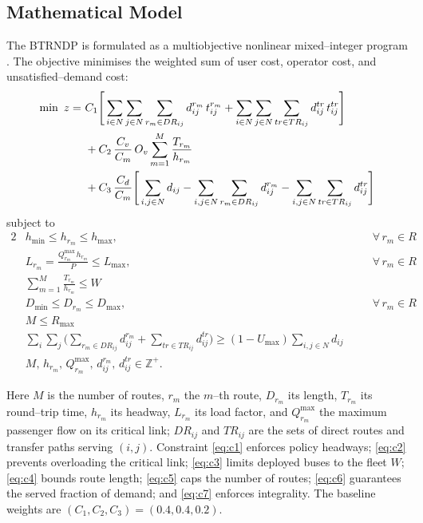 \documentclass [a4paper, 11pt, titlepage] {article}
\begin{document}
\subsection{Mathematical Model}
The BTRNDP is formulated as a multiobjective nonlinear mixed--integer program
\cite{fan2006}. The objective minimises the weighted sum of user cost, operator
cost, and unsatisfied--demand cost:
\begin{alignat}{2}
  \min~ z = ~& C_1 \Bigg[ \sum_{i\in N}\sum_{j\in N}\sum_{r_m\in DR_{ij}}
     d^{r_m}_{ij}\,t^{r_m}_{ij}
     + \sum_{i\in N}\sum_{j\in N}\sum_{tr\in TR_{ij}}
     d^{tr}_{ij}\,t^{tr}_{ij} \Bigg] \notag \\
   & + C_2 \, \frac{C_v}{C_m}\,O_v \sum_{m=1}^{M}\frac{T_{r_m}}{h_{r_m}}
     \notag \\
   & + C_3 \, \frac{C_d}{C_m}\Bigg[ \sum_{i,j\in N} d_{ij}
     - \sum_{i,j\in N}\sum_{r_m\in DR_{ij}} d^{r_m}_{ij}
     - \sum_{i,j\in N}\sum_{tr\in TR_{ij}} d^{tr}_{ij} \Bigg]
     \label{eq:obj}
\end{alignat}
subject to
\begin{alignat}{2}
  & h_{\min} \leq h_{r_m} \leq h_{\max}, & \quad & \forall\, r_m \in R
     \label{eq:c1}\\
  & L_{r_m} = \frac{Q^{\max}_{r_m}\,h_{r_m}}{P} \leq L_{\max}, & \quad &
     \forall\, r_m \in R \label{eq:c2}\\
  & \sum_{m=1}^{M}\frac{T_{r_m}}{h_{r_m}} \leq W & & \label{eq:c3}\\
  & D_{\min} \leq D_{r_m} \leq D_{\max}, & \quad & \forall\, r_m \in R
     \label{eq:c4}\\
  & M \leq R_{\max} & & \label{eq:c5}\\
  & \sum_{i}\sum_{j}\!\Big( \!\sum_{r_m\in DR_{ij}}\! d^{r_m}_{ij}
     + \!\sum_{tr\in TR_{ij}}\! d^{tr}_{ij}\Big)
     \geq (1-U_{\max})\!\sum_{i,j\in N}\! d_{ij} & & \label{eq:c6}\\
  & M,\,h_{r_m},\,Q^{\max}_{r_m},\,d^{r_m}_{ij},\,d^{tr}_{ij}
     \in \mathbb{Z}^{+}. & & \label{eq:c7}
\end{alignat}

Here $M$ is the number of routes, $r_m$ the $m$--th route, $D_{r_m}$ its length,
$T_{r_m}$ its round--trip time, $h_{r_m}$ its headway, $L_{r_m}$ its load factor,
and $Q^{\max}_{r_m}$ the maximum passenger flow on its critical link; $DR_{ij}$
and $TR_{ij}$ are the sets of direct routes and transfer paths serving $(i,j)$.
Constraint \eqref{eq:c1} enforces policy headways; \eqref{eq:c2} prevents
overloading the critical link; \eqref{eq:c3} limits deployed buses to the fleet
$W$; \eqref{eq:c4} bounds route length; \eqref{eq:c5} caps the number of routes;
\eqref{eq:c6} guarantees the served fraction of demand; and \eqref{eq:c7}
enforces integrality. The baseline weights are $(C_1,C_2,C_3)=(0.4,0.4,0.2)$.
\end{document}
